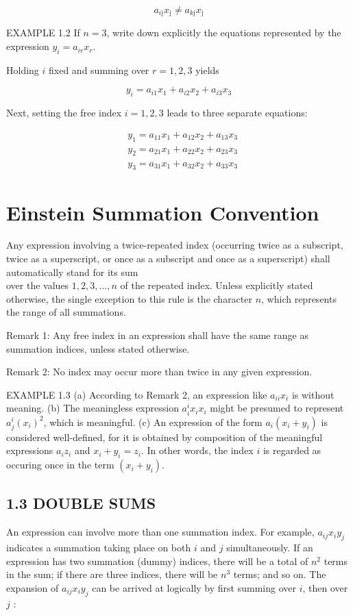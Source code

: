\documentclass[10pt]{article}
\begin{document}
$$
a_{i \mathrm{j}} x_{\mathrm{j}} \neq a_{k \mathrm{j}} x_{\mathrm{j}}
$$

EXAMPLE 1.2 If $n=3$, write down explicitly the equations represented by the expression $y_{i}=a_{i r} x_{r}$.

Holding $i$ fixed and summing over $r=1,2,3$ yields

$$
y_{i}=a_{i 1} x_{1}+a_{i 2} x_{2}+a_{i 3} x_{3}
$$

Next, setting the free index $i=1,2,3$ leads to three separate equations:

$$
\begin{aligned}
& y_{1}=a_{11} x_{1}+a_{12} x_{2}+a_{13} x_{3} \\
& y_{2}=a_{21} x_{1}+a_{22} x_{2}+a_{23} x_{3} \\
& y_{3}=a_{31} x_{1}+a_{32} x_{2}+a_{33} x_{3}
\end{aligned}
$$

\section*{Einstein Summation Convention}
Any expression involving a twice-repeated index (occurring twice as a subscript, twice as a superscript, or once as a subscript and once as a superscript) shall automatically stand for its sum\\
over the values $1,2,3, \ldots, n$ of the repeated index. Unless explicitly stated otherwise, the single exception to this rule is the character $n$, which represents the range of all summations.

Remark 1: Any free index in an expression shall have the same range as summation indices, unless stated otherwise.

Remark 2: No index may occur more than twice in any given expression.

EXAMPLE 1.3 (a) According to Remark 2, an expression like $a_{i i} x_{i}$ is without meaning. (b) The meaningless expression $a_{i}^{i} x_{i} x_{i}$ might be presumed to represent $a_{j}^{i}\left(x_{i}\right)^{2}$, which is meaningful. (c) An expression of the form $a_{i}\left(x_{i}+y_{i}\right)$ is considered well-defined, for it is obtained by composition of the meaningful expressions $a_{i} z_{i}$ and $x_{i}+y_{i}=z_{i}$. In other words, the index $i$ is regarded as occuring once in the term $\left(x_{i}+y_{i}\right)$.

\subsection*{1.3 DOUBLE SUMS}
An expression can involve more than one summation index. For example, $a_{i j} x_{i} y_{j}$ indicates a summation taking place on both $i$ and $j$ simultaneously. If an expression has two summation (dummy) indices, there will be a total of $n^{2}$ terms in the sum; if there are three indices, there will be $n^{3}$ terms; and so on. The expansion of $a_{i j} x_{i} y_{j}$ can be arrived at logically by first summing over $i$, then over $j$ :
\end{document}
